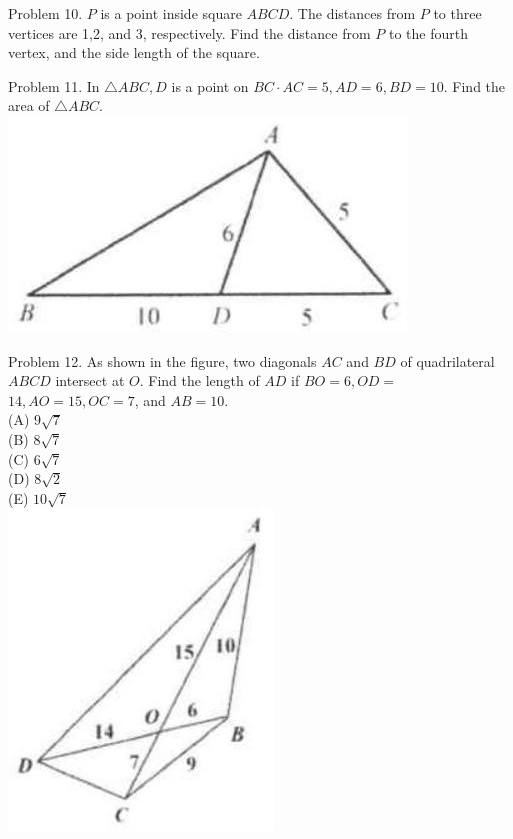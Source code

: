 \documentclass[10pt]{article}
\begin{document}
Problem 10. \(P\) is a point inside square \(A B C D\). The distances from \(P\) to three vertices are 1,2, and 3, respectively. Find the distance from \(P\) to the fourth vertex, and the side length of the square.

Problem 11. In \(\triangle A B C, D\) is a point on \(B C \cdot A C=5, A D=6, B D=10\). Find the area of \(\triangle A B C\).\\
\includegraphics[max width=\textwidth, center]{2025_04_17_97bc1f7e44d93c271a88g-090(1)}

Problem 12. As shown in the figure, two diagonals \(A C\) and \(B D\) of quadrilateral \(A B C D\) intersect at \(O\). Find the length of \(A D\) if \(B O=6, O D=\) \(14, A O=15, O C=7\), and \(A B=10\).\\
(A) \(9 \sqrt{7}\)\\
(B) \(8 \sqrt{7}\)\\
(C) \(6 \sqrt{7}\)\\
(D) \(8 \sqrt{2}\)\\
(E) \(10 \sqrt{7}\)\\
\includegraphics[max width=\textwidth, center]{2025_04_17_97bc1f7e44d93c271a88g-090(2)}
\end{document}
